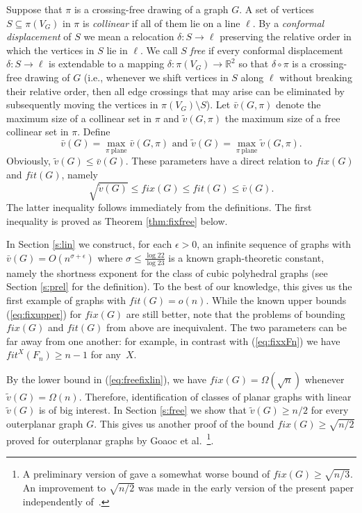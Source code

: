 \documentclass[reqno,12pt]{amsart}
\newcommand{\fix}[1]{\mathit{fix}(#1)}
\newcommand{\lin}[1]{\bar v(#1)}
\newcommand{\free}[1]{\tilde v(#1)}
\newcommand{\fit}[1]{\mathit{fit}(#1)}
\newcommand{\fitx}[1]{\mathit{fit}^X(#1)}
\newcommand{\reals}{\mathbb{R}}
\newcommand{\function}[2]{:#1 \rightarrow #2}
\newcommand{\refeq}[1]{(\ref{eq:#1})}
\begin{document}
Suppose that $\pi$ is a crossing-free drawing of a graph $G$.
A set of vertices $S\subseteq \pi(V_G)$ in $\pi$ is \emph{collinear} if all of them
lie on a line $\ell$. By a \emph{conformal displacement} of $S$
we mean a relocation $\delta\function S\ell$ preserving the relative order in which
the vertices in $S$ lie in $\ell$. We call $S$ \emph{free} if every
conformal displacement $\delta\function S\ell$ is extendable to a mapping
$\delta\function{\pi(V_G)}{\reals^2}$ so that $\delta\circ\pi$ is a crossing-free
drawing of $G$ (i.e., whenever we shift vertices in $S$ along $\ell$ without breaking
their relative order, then all edge crossings that may arise can be eliminated by subsequently
moving the vertices in $\pi(V_G)\setminus S$).
Let $\lin{G,\pi}$ denote the maximum size of a collinear set in $\pi$ and
$\free{G,\pi}$ the maximum size of a free collinear set in $\pi$.
Define
$$
\lin{G}=\max_{\pi\mathrm{\ plane}}\lin{G,\pi}\text{\ \ and\ \ }
\free{G}=\max_{\pi\mathrm{\ plane}}\free{G,\pi}.
$$
Obviously, $\free G\le\lin G$. These parameters have a direct relation to $\fix G$ and $\fit G$, namely
\begin{equation}\label{eq:freefixlin}
\sqrt{\free G}\le\fix G\le\fit G\le\lin G.
\end{equation}
The latter inequality follows immediately from the definitions. The first
inequality is proved as Theorem \ref{thm:fixfree} below.

In Section \ref{s:lin} we construct,
for each $\epsilon>0$, an infinite sequence of graphs with $\lin G=O(n^{\sigma+\epsilon})$
where $\sigma\le\frac{\log22}{\log23}$ is a known graph-theoretic constant, namely the shortness
exponent for the class of cubic polyhedral graphs (see Section \ref{s:prel} for the definition). 
To the best of our knowledge, this gives us the first example of graphs with
$\fit G=o(n)$. While the known upper bounds \refeq{fixupper} for $\fix G$ are still better,
note that the problems of bounding $\fix G$ and $\fit G$ from above are inequivalent.
The two parameters can be far away from one another: 
for example, in contrast with \refeq{fixxFn} we have $\fitx{F_n}\ge n-1$ for any~$X$.


By the lower bound in \refeq{freefixlin}, we have $\fix G=\Omega(\sqrt n)$ whenever
$\free G=\Omega(n)$. Therefore, identification of classes of planar graphs with linear $\free G$
is of big interest. In Section \ref{s:free} we show that
$\free G\ge n/2$ for every outerplanar graph $G$.
This gives us another proof of the bound $\fix G\ge\sqrt{n/2}$ proved for
outerplanar graphs by Goaoc et al.~\cite{merged}\footnote{A preliminary version of \cite{merged} gave a somewhat worse bound of $\fix G\ge\sqrt{n/3}$.
An improvement to $\sqrt{n/2}$ was made in the early version of the present paper
independently of~\cite{merged}.}.
\end{document}
